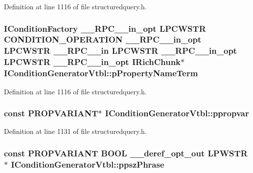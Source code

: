 Definition at line 1116 of file structuredquery.\+h.

\subsubsection[{\texorpdfstring{p\+Property\+Name\+Term}{pPropertyNameTerm}}]{ {\bf I\+Condition\+Factory} {\bf \+\_\+\+\_\+\+R\+P\+C\+\_\+\+\_\+in\+\_\+opt} {\bf L\+P\+C\+W\+S\+TR} {\bf C\+O\+N\+D\+I\+T\+I\+O\+N\+\_\+\+O\+P\+E\+R\+A\+T\+I\+ON} {\bf \+\_\+\+\_\+\+R\+P\+C\+\_\+\+\_\+in\+\_\+opt} {\bf L\+P\+C\+W\+S\+TR} {\bf \+\_\+\+\_\+\+R\+P\+C\+\_\+\+\_\+in} {\bf L\+P\+C\+W\+S\+TR} {\bf \+\_\+\+\_\+\+R\+P\+C\+\_\+\+\_\+in\+\_\+opt} {\bf L\+P\+C\+W\+S\+TR} {\bf \+\_\+\+\_\+\+R\+P\+C\+\_\+\+\_\+in\+\_\+opt} {\bf I\+Rich\+Chunk}$\ast$ I\+Condition\+Generator\+Vtbl\+::p\+Property\+Name\+Term}\hypertarget{struct_i_condition_generator_vtbl_a2ea88dff27cbc3ee82df18c2133efad3}{}\label{struct_i_condition_generator_vtbl_a2ea88dff27cbc3ee82df18c2133efad3}


Definition at line 1116 of file structuredquery.\+h.

\subsubsection[{\texorpdfstring{ppropvar}{ppropvar}}]{ {\bf const} {\bf P\+R\+O\+P\+V\+A\+R\+I\+A\+NT}$\ast$ I\+Condition\+Generator\+Vtbl\+::ppropvar}\hypertarget{struct_i_condition_generator_vtbl_aee771d54ddbe28436128e81011093c48}{}\label{struct_i_condition_generator_vtbl_aee771d54ddbe28436128e81011093c48}


Definition at line 1131 of file structuredquery.\+h.

\subsubsection[{\texorpdfstring{ppsz\+Phrase}{ppszPhrase}}]{ {\bf const} {\bf P\+R\+O\+P\+V\+A\+R\+I\+A\+NT} {\bf B\+O\+OL} {\bf \+\_\+\+\_\+deref\+\_\+opt\+\_\+out} {\bf L\+P\+W\+S\+TR}$\ast$ I\+Condition\+Generator\+Vtbl\+::ppsz\+Phrase}\hypertarget{struct_i_condition_generator_vtbl_a9b399b450dfa3562e901183b1fd4338e}{}\label{struct_i_condition_generator_vtbl_a9b399b450dfa3562e901183b1fd4338e}


